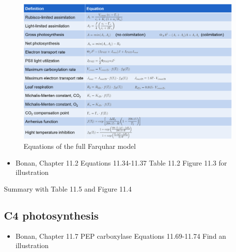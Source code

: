 \documentclass[
  oneside]{book}
\providecommand{\tightlist}{%
  \setlength{\itemsep}{0pt}\setlength{\parskip}{0pt}}
\begin{document}
\begin{figure}

{\centering \includegraphics[width=0.8\linewidth]{figures/chap2/full_farquhar} 

}

\caption{Equations of the full Farquhar model}\label{fig:f210}
\end{figure}

\begin{itemize}
\tightlist
\item
  Bonan, Chapter 11.2
  Equations 11.34-11.37
  Table 11.2
  Figure 11.3 for illustration
\end{itemize}

Summary with Table 11.5 and Figure 11.4

\hypertarget{c4-photosynthesis}{%
\subsection{C4 photosynthesis}\label{c4-photosynthesis}}

\begin{itemize}
\tightlist
\item
  Bonan, Chapter 11.7
  PEP carboxylase
  Equations 11.69-11.74
  Find an illustration
\end{itemize}
\end{document}
